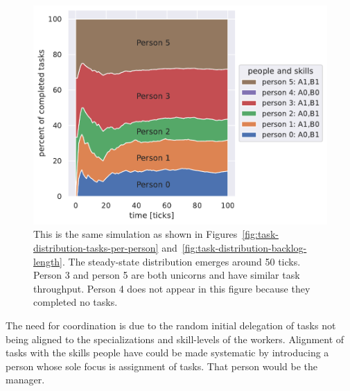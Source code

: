 \begin{figure}[H] %
\centering
\iftoggle{narrowpage}{\newcommand\imgwidth{1}}{\newcommand\imgwidth{0.7}}
\includegraphics[width=\imgwidth\textwidth]{images/task_distribution_percent_of_tasks_per_person_simCount1_skills2_levels1_taskduration1_people6_social0_ticks100.pdf}
\caption{This is the same simulation as shown in Figures~\ref{fig:task-distribution-tasks-per-person} and~\ref{fig:task-distribution-backlog-length}. The steady-state distribution emerges around 50 ticks. Person 3 and person 5 are both unicorns and have similar task throughput. Person 4 does not appear in this figure because they completed no tasks.}
\label{fig:task-distribution-percent-of-tasks}
\end{figure}






The need for coordination is due to the random initial delegation of tasks not being aligned to the specializations and skill-levels of the workers. Alignment of tasks with the skills people have could be made systematic by introducing a person whose sole focus is assignment of tasks. That person would be the manager.




